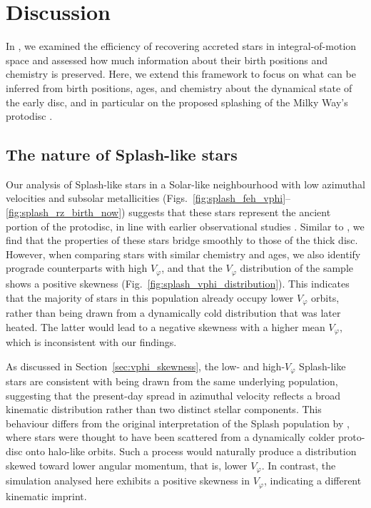 \documentclass[fleqn,usenatbib]{mnras}
\begin{document}
\section{Discussion}
\label{sec:discussion}

In , we examined the efficiency of recovering accreted stars in integral-of-motion space and assessed how much information about their birth positions and chemistry is preserved. Here, we extend this framework to focus on what can be inferred from birth positions, ages, and chemistry about the dynamical state of the early disc, and in particular on the proposed splashing of the Milky Way's protodisc \citep{Belokurov2020}.

\subsection{The nature of Splash-like stars}

Our analysis of Splash-like stars in a Solar-like neighbourhood with low azimuthal velocities and subsolar metallicities (Figs.~\ref{fig:splash_feh_vphi}--\ref{fig:splash_rz_birth_now}) suggests that these stars represent the ancient portion of the protodisc, in line with earlier observational studies \citep{Bonaca2017, Haywood2018b, DiMatteo2019, Gallart2019, Belokurov2020, Viswanathan2025b}. Similar to \citet{Belokurov2020}, we find that the properties of these stars bridge smoothly to those of the thick disc. However, when comparing stars with similar chemistry and ages, we also identify prograde counterparts with high $V_\varphi$, and that the $V_\varphi$ distribution of the sample shows a positive skewness (Fig.~\ref{fig:splash_vphi_distribution}). This indicates that the majority of stars in this population already occupy lower $V_\varphi$ orbits, rather than being drawn from a dynamically cold distribution that was later heated. The latter would lead to a negative skewness with a higher mean $V_\varphi$, which is inconsistent with our findings.

As discussed in Section~\ref{sec:vphi_skewness}, the low- and high-$V_\varphi$ Splash-like stars are consistent with being drawn from the same underlying population, suggesting that the present-day spread in azimuthal velocity reflects a broad kinematic distribution rather than two distinct stellar components.
This behaviour differs from the original interpretation of the Splash population by \citet{Belokurov2020}, where stars were thought to have been scattered from a dynamically colder proto-disc onto halo-like orbits. Such a process would naturally produce a distribution skewed toward lower angular momentum, that is, lower $V_\varphi$. In contrast, the simulation analysed here exhibits a positive skewness in $V_\varphi$, indicating a different kinematic imprint.
\end{document}
